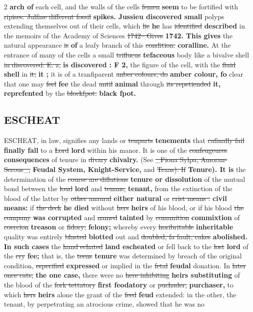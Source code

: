 \documentclass[10pt]{article}
\begin{document}
\begin{multicols}{2}
\textbf{arch of} each cell, and the walls of the cells \sout{femen} \textbf{seem} to be fortified with \sout{ripises. Julfine different fossil} \textbf{spikes. Jussieu discovered small} polyps extending themselves out of their cells, which \sout{lie} \textbf{he} has \sout{identified} \textbf{described} in the memoirs of the Academy of Sciences \sout{1742-- Gives} \textbf{1742. This gives} the natural appearance \sout{is} \textbf{of} a leafy branch of this \sout{condition.} \textbf{coralline.} At the entrance of many of the cells a small \sout{triflucus} \textbf{tefaceous} body like a bivalve shell \sout{in discovered: E. z,} \textbf{is discovered : F 2,} the figure of the cell, with the \sout{fluid} \textbf{shell} in \sout{it;} \textbf{it ;} it is of a tranfiparent \sout{anber colours, do} \textbf{amber colour, fo} clear that one may \sout{feel} \textbf{fee} the dead \sout{until} \textbf{animal} through \sout{its repetiended} \textbf{it, reprefented} by the \sout{blockfpot.} \textbf{black fpot.}

\subsection*{ESCHEAT}
ESCHEAT, in law, signifies any lands or \sout{tenparts} \textbf{tenements} that \sout{cafinally fail} \textbf{finally fall} to a \sout{Lord} \textbf{lord} within his manor. It is one of the \sout{confeugeures} \textbf{consequences} of tenure in \sout{divary} \textbf{chivalry.} (See \sout{\_Fiona Sylpa, Amoran-Serous\_,} \textbf{Feudal System, Knight-Service,} and \sout{Texas). If} \textbf{Tenure). It is} the determination of the \sout{course are diflutions} \textbf{tenure or dissolution} of the mutual bond between the \sout{loud} \textbf{lord} and \sout{tenans,} \textbf{tenant,} from the extinction of the blood of the latter by \sout{other anaural} \textbf{either natural} or \sout{crist means :} \textbf{civil means:} if \sout{the deck} \textbf{he died} without \sout{hers} \textbf{heirs} of his blood, or if his blood \sout{the company} \textbf{was corrupted} and \sout{named} \textbf{tainted} by \sout{comunition} \textbf{commixtion} of \sout{coercion} \textbf{treason} or \sout{fidory;} \textbf{felony;} whereby every \sout{horibritable} \textbf{inheritable} quality was entirely \sout{blasted} \textbf{blotted} out and \sout{doubled, fa fault, cakes} \textbf{abolished. In such cases} the \sout{hand echated} \textbf{land escheated} or fell back to the \sout{lost} \textbf{lord} of the \sout{cry} \textbf{fee;} that is, the \sout{teens} \textbf{tenure} was determined by breach of the original condition, \sout{esperified} \textbf{expressed} or implied in the \sout{fetal} \textbf{feudal} donation. In \sout{later once cats,} \textbf{the one case,} there were no \sout{here inhibiting} \textbf{heirs substituting} of the blood of the \sout{fork tettatory} \textbf{first feodatory} or \sout{puchader,} \textbf{purchaser,} to which \sout{hers} \textbf{heirs} alone the grant of the \sout{feed} \textbf{feud} extended: in the other, the tenant, by perpetrating an atrocious crime, showed that he was no
\end{multicols}
\end{document}

